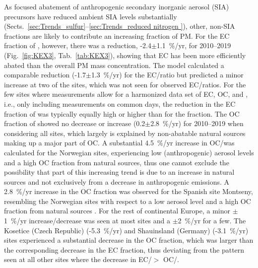 As focused abatement of anthropogenic secondary inorganic aerosol (SIA)
precursors have reduced ambient SIA levels substantially (Sects.~\ref{sec:Trends_sulfur}--\ref{sec:Trends_reduced nitrogen }), 
other, non-SIA fractions are likely to contribute an increasing fraction
of PM. For the EC fraction of \pmfine, however, there was a reduction,  -2.4$\pm$1.1~\%/yr, 
for 2010--2019 (Fig.~\ref{fig:KEX3}, Tab.~\ref{tab:KEX3}), showing that EC has been
more efficiently abated than the overall PM mass concentration. The model
calculated a comparable reduction (-1.7$\pm$1.3~\%/yr) for the EC/\pmfine ratio
but predicted a minor increase at two of the sites, which was not seen for
observed EC/\pmfine ratios. For the few sites where measurements allow for
a harmonized data set of EC, OC,  and \pmfine, i.e., only including
measurements on common days, the reduction in the EC fraction of \pmfine
was typically equally high or higher than for the  fraction. The
OC fraction of \pmfine showed no decrease or increase (0.2$\pm$2.8~\%/yr)
for 2010--2019 when considering all sites, which largely is explained by
non-abatable natural sources making up a major part of OC. A substantial
4.5~\%/yr increase in OC/\pmfine was calculated for the Norwegian sites,
experiencing low (anthropogenic) aerosol levels and a high OC fraction
from natural sources, thus one cannot exclude the possibility that part
of this increasing trend is due to an increase in natural sources and
not exclusively from a decrease in anthropogenic emissions. A 2.8~\%/yr
increase in the OC fraction was observed for the Spanish site Montseny,
resembling the Norwegian sites with respect to a low aerosol level and
a high OC fraction from natural sources \citep{Kulmala2011,Crippa2014}. For the
rest of continental Europe, a minor $\pm$1~\%/yr increase/decrease
was seen at most sites and a $\pm$2~\%/yr for a few. The Kosetice
(Czech Republic) (-5.3~\%/yr) and Shauinsland (Germany) (-3.1~\%/yr) sites
experienced a substantial decrease in the OC fraction, which was larger
than the corresponding decrease in the EC fraction, thus deviating from
the pattern seen at all other sites where the decrease in EC/\pmfine $>$
OC/\pmfine.

